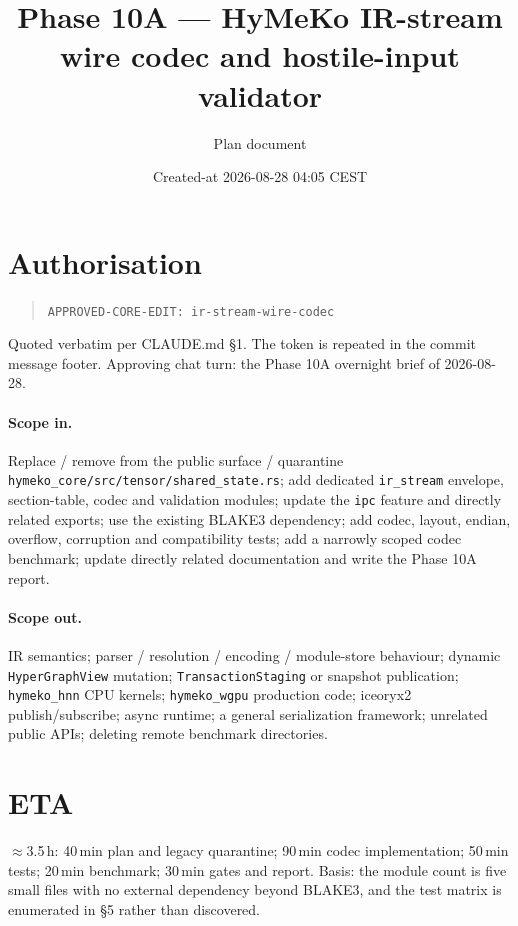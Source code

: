 \documentclass[11pt,a4paper]{article}
\title{Phase 10A --- HyMeKo IR-stream wire codec and hostile-input validator}
\author{Plan document}
\date{Created-at 2026-08-28 04:05 CEST}
\begin{document}
\maketitle

\section*{Authorisation}

\begin{quote}
\texttt{APPROVED-CORE-EDIT: ir-stream-wire-codec}
\end{quote}

Quoted verbatim per CLAUDE.md \S1. The token is repeated in the commit message
footer. Approving chat turn: the Phase 10A overnight brief of 2026-08-28.

\paragraph{Scope in.} Replace / remove from the public surface / quarantine
\texttt{hymeko\_core/src/tensor/shared\_state.rs}; add dedicated
\texttt{ir\_stream} envelope, section-table, codec and validation modules;
update the \texttt{ipc} feature and directly related exports; use the existing
BLAKE3 dependency; add codec, layout, endian, overflow, corruption and
compatibility tests; add a narrowly scoped codec benchmark; update directly
related documentation and write the Phase 10A report.

\paragraph{Scope out.} IR semantics; parser / resolution / encoding /
module-store behaviour; dynamic \texttt{HyperGraphView} mutation;
\texttt{TransactionStaging} or snapshot publication; \texttt{hymeko\_hnn} CPU
kernels; \texttt{hymeko\_wgpu} production code; iceoryx2 publish/subscribe;
async runtime; a general serialization framework; unrelated public APIs;
deleting remote benchmark directories.

\section*{ETA}

$\approx$3.5\,h: 40\,min plan and legacy quarantine; 90\,min codec
implementation; 50\,min tests; 20\,min benchmark; 30\,min gates and report.
Basis: the module count is five small files with no external dependency beyond
BLAKE3, and the test matrix is enumerated in \S5 rather than discovered.
\end{document}
